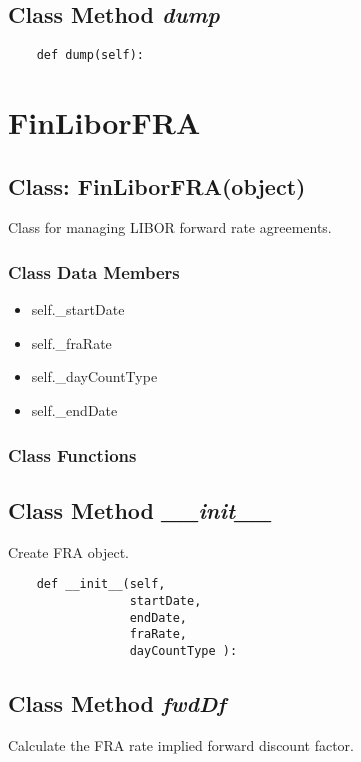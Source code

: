 \documentclass[twoside,11pt]{book}
\begin{document}
\subsection{Class Method {\it dump}}


\begin{lstlisting}
    def dump(self):
\end{lstlisting}

\newpage
\section{FinLiborFRA}

\subsection{Class: FinLiborFRA(object)}
Class for managing LIBOR forward rate agreements. 

\subsubsection{Class Data Members}
\begin{itemize}
\item{self.\_startDate}
\item{self.\_fraRate}
\item{self.\_dayCountType}
\item{self.\_endDate}
\end{itemize}

\subsubsection{Class Functions}

\subsection{Class Method {\it \_\_init\_\_}}
Create FRA object. 

\begin{lstlisting}
    def __init__(self, 
                 startDate, 
                 endDate, 
                 fraRate, 
                 dayCountType ):
\end{lstlisting}

\subsection{Class Method {\it fwdDf}}
Calculate the FRA rate implied forward discount factor. 
\end{document}
